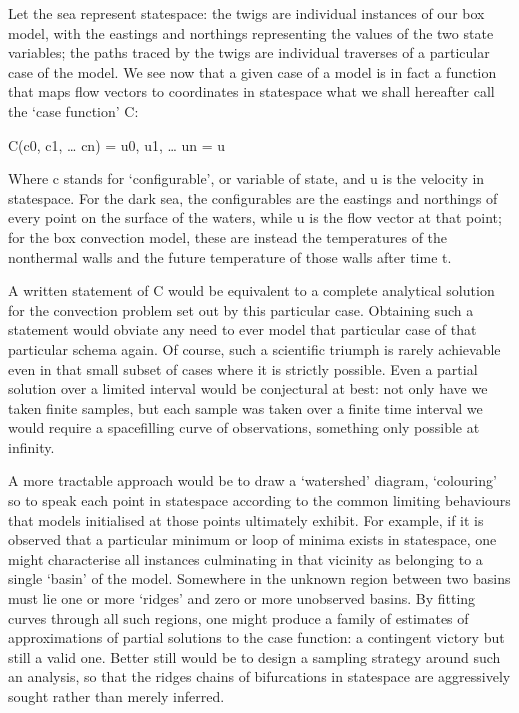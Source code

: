 \documentclass[letterpaper,10pt,english]{jupyterBook}
\begin{document}
\sphinxAtStartPar
Let the sea represent state\sphinxhyphen{}space: the twigs are individual instances of our box model, with the eastings and northings representing the values of the two state variables; the paths traced by the twigs are individual traverses of a particular case of the model. We see now that a given case of a model is in fact a function that maps flow vectors to coordinates in state\sphinxhyphen{}space \sphinxhyphen{} what we shall hereafter call the ‘case function’ C:

\sphinxAtStartPar
C(c0, c1, … cn) =  u0, u1, … un = u

\sphinxAtStartPar
Where c stands for ‘configurable’, or variable of state, and u is the velocity in state\sphinxhyphen{}space. For the dark sea, the configurables are the eastings and northings of every point on the surface of the waters, while u is the flow vector at that point; for the box convection model, these are instead the temperatures of the non\sphinxhyphen{}thermal walls and the future temperature of those walls after time t.

\sphinxAtStartPar
A written statement of C would be equivalent to a complete analytical solution for the convection problem set out by this particular case. Obtaining such a statement would obviate any need to ever model that particular case of that particular schema again. Of course, such a scientific triumph is rarely achievable even in that small subset of cases where it is strictly possible. Even a partial solution over a limited interval would be conjectural at best: not only have we taken finite samples, but each sample was taken over a finite time interval \sphinxhyphen{} we would require a space\sphinxhyphen{}filling curve of observations, something only possible at infinity.

\sphinxAtStartPar
A more tractable approach would be to draw a ‘watershed’ diagram, ‘colouring’ \sphinxhyphen{} so to speak \sphinxhyphen{} each point in state\sphinxhyphen{}space according to the common limiting behaviours that models initialised at those points ultimately exhibit. For example, if it is observed that a particular minimum or loop of minima exists in state\sphinxhyphen{}space, one might characterise all instances culminating in that vicinity as belonging to a single ‘basin’ of the model. Somewhere in the unknown region between two basins must lie one or more ‘ridges’ and zero or more unobserved basins. By fitting curves through all such regions, one might produce a family of estimates of approximations of partial solutions to the case function: a contingent victory but still a valid one. Better still would be to design a sampling strategy around such an analysis, so that the ridges \sphinxhyphen{} chains of bifurcations in state\sphinxhyphen{}space \sphinxhyphen{} are aggressively sought rather than merely inferred.
\end{document}
